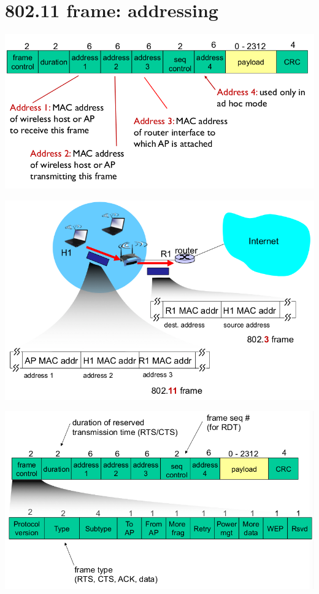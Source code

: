 \documentclass{article}[18pt]
\begin{document}
\section{802.11 frame: addressing}
\begin{center}
	\includegraphics[scale=0.7]{addressing}
\end{center}
\begin{center}
	\includegraphics[scale=0.7]{addressing1}
\end{center}
\begin{center}
	\includegraphics[scale=0.7]{addressing2}
\end{center}
\end{document}
